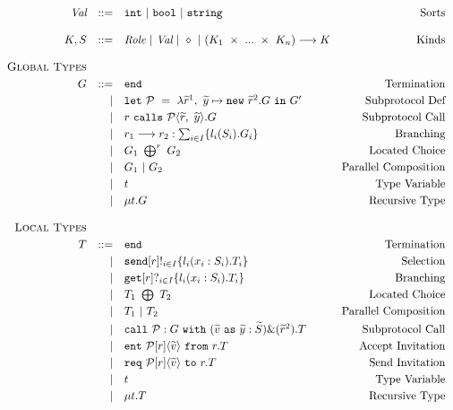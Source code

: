 \documentclass[12pt,twoside]{report}
\begin{document}
\begin{figure}[h]
    \centering
    \begin{equation*}
    \centering
    \begin{array}{rrlr}
        \textit{Val} & ::= & \texttt{int}\ |\ \texttt{bool}\ |\ \texttt{string} & \text{Sorts}\\\\
        K, S & ::= & \textit{Role}\ |\ \textit{Val}\ |\ \diamond\ |\ (K_1\ \times\ ...\ \times\ K_n) \longrightarrow K & \text{Kinds}\\\\
        
        \textsc{Global\ Types} & & &\\[3pt]
        G & ::= & \texttt{end} & \text{Termination}  \\[2.75pt]
             & | & \texttt{let}\ \mathcal{P}\ =\ \lambda\widetilde{r}^1,\ \widetilde{y} \mapsto \texttt{new}\ \widetilde{r}^2.G\ \texttt{in}\ G' & \text{Subprotocol\ Def}\\[2.75pt]
             & | & r\ \texttt{calls}\ \mathcal{P}\langle \widetilde{r},\ \widetilde{y}\rangle.G  & \text{Subprotocol\ Call} \\[2.75pt]
             & | & r_1 \longrightarrow r_2: \sum_{i \in I}\{l_i( S_i).G_i\} &  \text{Branching} \\[2.75pt]
             & | & G_1\ \bigoplus^r\ G_2   & \text{Located Choice} \\[2.75pt]
             & | & G_1\ |\ G_2 & \text{Parallel\ Composition} \\[2.75pt]
             & | & t & \text{Type\ Variable}\\[2.75pt]
             & | & \mu t.G & \text{Recursive\ Type}\\\\
             
        \textsc{Local Types} &&& \\[3pt]
        T & ::= & \texttt{end} &  \text{Termination}  \\[2.75pt]
          & | & \texttt{send}[r]!_{i \in I}\{ l_i(x_i: S_i).T_i\} & \text{Selection} \\[2.75pt]
          & | & \texttt{get}[r]?_{i \in I}\{l_i(x_i:S_i).T_i\} &  \text{Branching} \\[2.75pt] 
          & | & T_1\ \bigoplus \ T_2   & \text{Located Choice} \\[2.75pt]
          & | & T_1\ |\ T_2 & \text{Parallel\ Composition} \\[2.75pt]
          & | & \texttt{call}\ \mathcal{P}:G\ \texttt{with}\ (\widetilde{v}\ \texttt{as}\ \widetilde{y}:\widetilde{S})\&(\widetilde{r}^2).T &  \text{Subprotocol Call} \\[2.75pt]
          & | & \texttt{ent}\ \mathcal{P}[r]\langle \widetilde{v} \rangle\ \texttt{from}\ r.T &  \text{Accept Invitation} \\[2.75pt]
          & | & \texttt{req}\ \mathcal{P}[r]\langle \widetilde{v} \rangle\ \texttt{to}\ r.T &  \text{Send Invitation} \\[2.75pt]
          & | & t &  \text{Type\ Variable} \\[2.75pt]
          & | & \mu t.T &  \text{Recursive\ Type}
        

\end{array}
\end{equation*}
\end{figure}
\end{document}
